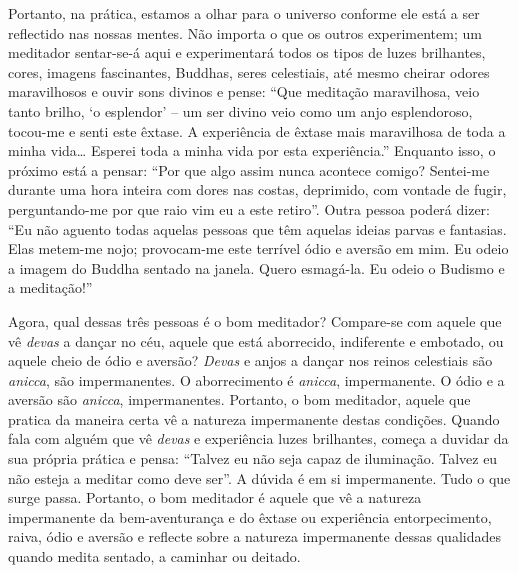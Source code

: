 Portanto, na prática, estamos a olhar para o universo conforme ele está a ser
reflectido nas nossas mentes. Não importa o que os outros experimentem; um
meditador sentar-se-á aqui e experimentará todos os tipos de luzes brilhantes,
cores, imagens fascinantes, Buddhas, seres celestiais, até mesmo cheirar odores
maravilhosos e ouvir sons divinos e pense: ``Que meditação maravilhosa, veio
tanto brilho, `o esplendor' -- um ser divino veio como um anjo esplendoroso,
tocou-me e senti este êxtase. A experiência de êxtase mais maravilhosa de toda a
minha vida\ldots{} Esperei toda a minha vida por esta experiência.'' Enquanto
isso, o próximo está a pensar: ``Por que algo assim nunca acontece comigo?
Sentei-me durante uma hora inteira com dores nas costas, deprimido, com vontade
de fugir, perguntando-me por que raio vim eu a este retiro''. Outra pessoa
poderá dizer: ``Eu não aguento todas aquelas pessoas que têm aquelas ideias
parvas e fantasias. Elas metem-me nojo; provocam-me este terrível ódio e aversão
em mim. Eu odeio a imagem do Buddha sentado na janela. Quero esmagá-la. Eu odeio
o Budismo e a meditação!''

Agora, qual dessas três pessoas é o bom meditador? Compare-se com aquele que vê
\emph{devas} a dançar no céu, aquele que está aborrecido, indiferente e
embotado, ou aquele cheio de ódio e aversão? \emph{Devas} e anjos a dançar nos
reinos celestiais são \emph{anicca}, são impermanentes. O aborrecimento é
\emph{anicca}, impermanente. O ódio e a aversão são \emph{anicca},
impermanentes. Portanto, o bom meditador, aquele que pratica da maneira certa vê
a natureza impermanente destas condições. Quando fala com alguém que vê
\emph{devas} e experiência luzes brilhantes, começa a duvidar da sua própria
prática e pensa: ``Talvez eu não seja capaz de iluminação. Talvez eu não esteja
a meditar como deve ser''. A dúvida é em si impermanente. Tudo o que surge
passa. Portanto, o bom meditador é aquele que vê a natureza impermanente da
bem-aventurança e do êxtase ou experiência entorpecimento, raiva, ódio e aversão
e reflecte sobre a natureza impermanente dessas qualidades quando medita
sentado, a caminhar ou deitado.

